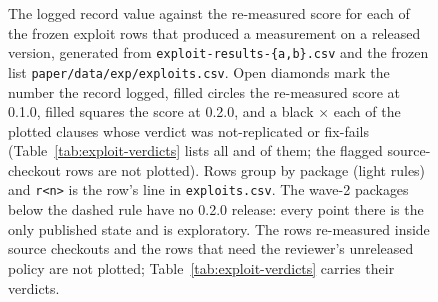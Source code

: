 \begin{figure}[!tbp]
\caption{The logged record value against the re-measured score for each of the \exploitDumbbellRows{} frozen exploit rows that produced a measurement on a released version, generated from \texttt{exploit-results-}\allowbreak\texttt{\{a,b\}.csv} and the frozen list \texttt{paper/data/exp/}\allowbreak\texttt{exploits.csv}. Open diamonds mark the number the record logged, filled circles the re-measured score at 0.1.0, filled squares the score at 0.2.0, and a black $\times$ each of the \exploitDumbbellFlagged{} plotted clauses whose verdict was not-replicated or fix-fails (Table~\ref{tab:exploit-verdicts} lists all \expExplNotReplicated{} and \expExplFixFails{} of them; the \expExplCNotReplicated{} flagged source-checkout rows are not plotted). Rows group by package (light rules) and \texttt{r<n>} is the row's line in \texttt{exploits.csv}. The wave-2 packages below the dashed rule have no 0.2.0 release: every point there is the only published state and is exploratory. The rows re-measured inside source checkouts and the \expExplPolicyOnly{} rows that need the reviewer's unreleased policy are not plotted; Table~\ref{tab:exploit-verdicts} carries their verdicts.}
\label{fig:exploits}
\end{figure}
